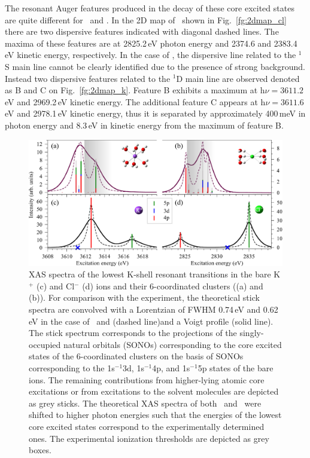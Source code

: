 The resonant Auger features produced in the decay of these core excited states are quite different for \cli~and \ki. In the 2D map of \cli~shown in Fig.\ \ref{fg:2dmap_cl} there are two dispersive features indicated with diagonal dashed lines. The maxima of these features are at 2825.2\,eV photon energy and 2374.6 and 2383.4\,eV kinetic energy, respectively. In the case of \ki, the dispersive line related to the $^1$S main line cannot be clearly identified due to the presence of strong background. Instead two dispersive features related to the $^1$D main line are observed denoted as B and C on Fig.\ \ref{fg:2dmap_k}. Feature B exhibits a maximum at h$\nu = 3611.2$\,eV and 2969.2\,eV kinetic energy. The additional feature C appears at h$\nu = 3611.6$\,eV and 2978.1\,eV kinetic energy, thus it is separated by approximately 400\,meV in photon energy and 8.3\,eV in kinetic energy from the maximum of feature B. 

\begin{figure}[h!]
\centering
\includegraphics[scale=0.75]{figures/xas_spectra.eps}
\caption{XAS spectra of the lowest K-shell resonant transitions in the bare K$^{+}$ (c) and Cl$^{-}$ (d) ions and their 6-coordinated clusters ((a) and (b)). For comparison with the experiment, the theoretical stick spectra are convolved with a Lorentzian of FWHM  0.74\,eV and 0.62\,eV in the case of \ki~and \cli \citep{Krause79:329} (dashed line)and a Voigt profile (solid line). The stick spectrum corresponds to the projections of the singly-occupied natural orbitals (SONOs) corresponding to the core excited states of the 6-coordinated clusters on the basis of SONOs corresponding to the 1s$^{-1}$3d, 1s$^{-1}$4p, and 1s$^{-1}$5p states of the bare ions. The remaining contributions from higher-lying atomic core excitations or from excitations to the solvent molecules are depicted as grey sticks. The theoretical XAS spectra of both \ki~and \cli~were shifted to higher photon energies such that the energies of the lowest core excited states correspond to the experimentally determined ones. The experimental ionization thresholds are depicted as grey boxes.}
\label{fg:xas_kcl}
\end{figure}


